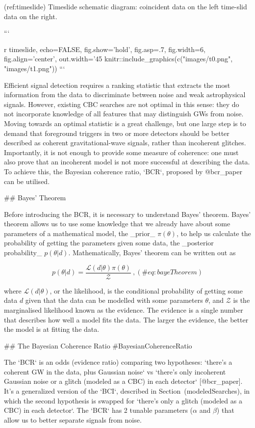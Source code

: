 {{{{{{{{{{{{{{{{{{(ref:timeslide) Timeslide schematic diagram: coincident data on the left time-slid data on the right.

```{r timeslide, echo=FALSE, fig.show='hold', fig.asp=.7, fig.width=6, fig.align='center', out.width='45%
knitr::include_graphics(c("images/t0.png", "images/t1.png"))
```

Efficient signal detection requires a ranking statistic that extracts
the most information from the data to discriminate between
noise and weak astrophysical signals. However, existing CBC searches are
not optimal in this sense: they do not incorporate knowledge of all
features that may distinguish GWs from noise. Moving towards an optimal
statistic is a great challenge, but one large step is to demand that
foreground triggers in two or more detectors should be better described
as coherent gravitational-wave signals, rather than incoherent glitches.
Importantly, it is not enough to provide some measure of coherence: one
must also prove that an incoherent model is not more successful at
describing the data. To achieve this, the Bayesian coherence ratio,
`BCR`, proposed by @bcr_paper can be utilised.

## Bayes' Theorem

Before introducing the BCR, it is necessary to understand Bayes' theorem. Bayes' theorem allows us to use some knowledge
that we already have about some parameters of a mathematical model, the _prior_ $\pi(\theta)$, to help us calculate the
probability of getting the parameters given some data, the _posterior probability_ $p(\theta|d)$.  Mathematically,
Bayes' theorem can be written out as

\begin{equation}
{p(\theta|d)} = \frac{\mathcal{L}(d|\theta)\pi(\theta)}{\mathcal{Z}}\ , (\#eq:bayeTheorem)
\end{equation}

where $\mathcal{L}(d|\theta)$, or the likelihood, is the conditional probability of getting some data $d$ given that the
data can be modelled with some parameters $\theta$, and $\mathcal{Z}$ is the marginalised likelihood known as the
evidence. The evidence is a single number that describes how well a model fits the data. The larger the evidence, the
better the model is at fitting the data.


## The Bayesian Coherence Ratio {#BayesianCoherenceRatio}

The `BCR` is an odds (evidence ratio) comparing two hypotheses: `there's
a coherent GW in the data, plus Gaussian noise` vs `there's only
incoherent Gaussian noise or a glitch (modeled as a CBC) in each
detector` [@bcr_paper]. It's a generalized version of the `BCI`,
described in Section~\@ref(modeledSearches), in which the second
hypothesis is swapped for `there's only a glitch (modeled as a CBC) in
each detector`. The `BCR` has 2 tunable parameters ($\alpha$ and
$\beta$) that allow us to better separate signals from noise.

}}}}}}}}}}}}}}}}}}}
